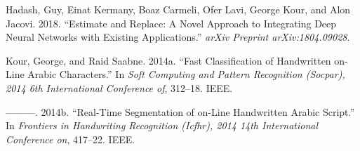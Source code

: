 \documentclass{article}
\begin{document}
\hypertarget{refs}{}
\leavevmode\hypertarget{ref-hadash2018estimate}{}%
Hadash, Guy, Einat Kermany, Boaz Carmeli, Ofer Lavi, George Kour, and
Alon Jacovi. 2018. ``Estimate and Replace: A Novel Approach to
Integrating Deep Neural Networks with Existing Applications.''
\emph{arXiv Preprint arXiv:1804.09028}.

\leavevmode\hypertarget{ref-kour2014fast}{}%
Kour, George, and Raid Saabne. 2014a. ``Fast Classification of
Handwritten on-Line Arabic Characters.'' In \emph{Soft Computing and
Pattern Recognition (Socpar), 2014 6th International Conference of},
312--18. IEEE.

\leavevmode\hypertarget{ref-kour2014real}{}%
---------. 2014b. ``Real-Time Segmentation of on-Line Handwritten Arabic
Script.'' In \emph{Frontiers in Handwriting Recognition (Icfhr), 2014
14th International Conference on}, 417--22. IEEE.



\end{document}
